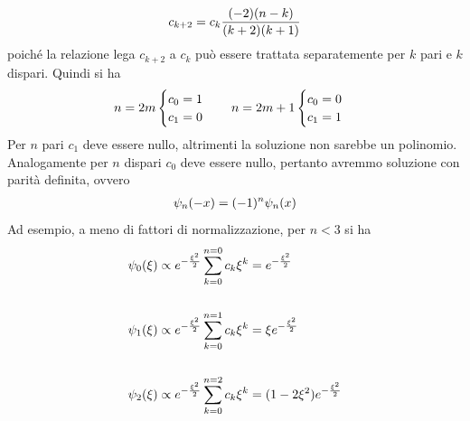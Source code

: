 \documentclass{article}
\begin{document}
\begin{gather}
    c_{k + 2} = c_k\frac{(-2)(n - k)}{(k + 2)(k + 1)} \notag
\end{gather}
poiché la relazione lega $c_{k + 2}$ a $c_k$ può essere trattata separatemente per $k$ pari e $k$ dispari. Quindi si ha
\begin{gather}
    n = 2m \begin{cases}
        c_0 = 1 \\
        c_1 = 0
    \end{cases}
    \quad
    n = 2m + 1 \begin{cases}
        c_0 = 0 \\
        c_1 = 1
    \end{cases} \notag
\end{gather}
Per $n$ pari $c_1$ deve essere nullo, altrimenti la soluzione non sarebbe un polinomio. Analogamente per $n$ dispari $c_0$ deve essere nullo, pertanto avremmo soluzione con parità definita, ovvero
\begin{gather}
    \psi_n(-x) = (-1)^n\psi_n(x) \notag
\end{gather}
Ad esempio, a meno di fattori di normalizzazione, per $n < 3$ si ha
\begin{align}
    \psi_0(\xi) &\propto e^{-\frac{\xi^2}{2}}\sum_{k = 0}^{n = 0}c_k\xi^k = e^{-\frac{\xi^2}{2}} \notag \\ \notag \\
    \psi_1(\xi) &\propto e^{-\frac{\xi^2}{2}}\sum_{k = 0}^{n = 1}c_k\xi^k = \xi e^{-\frac{\xi^2}{2}} \notag \\ \notag \\
    \psi_2(\xi) &\propto e^{-\frac{\xi^2}{2}}\sum_{k = 0}^{n = 2}c_k\xi^k = (1 - 2\xi^2)e^{-\frac{\xi^2}{2}} \notag  
\end{align}
\end{document}
